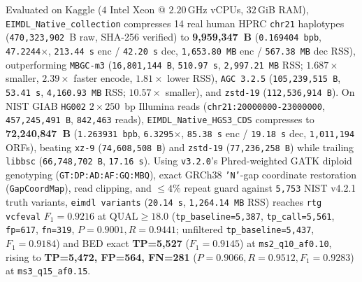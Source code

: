 \documentclass[10pt]{article}
\theoremstyle{definition}
\begin{document}
\begin{enumerate}
  Evaluated on Kaggle ($4$ Intel Xeon @ $2.20$\,GHz vCPUs, $32$\,GiB RAM), \texttt{EIMDL\_Native\_collection} compresses 14 real human HPRC \texttt{chr21} haplotypes (\texttt{470,323,902}~B raw, SHA-256 verified) to \textbf{9,959,347~B} (\texttt{0.169404~bpb}, \texttt{47.2244$\times$}, \texttt{213.44~s} enc / \texttt{42.20~s} dec, \texttt{1,653.80~MB} enc / \texttt{567.38~MB} dec RSS), outperforming \texttt{MBGC-m3} (\texttt{16,801,144~B}, \texttt{510.97~s}, \texttt{2,997.21~MB} RSS; $1.687\times$ smaller, $2.39\times$ faster encode, $1.81\times$ lower RSS), \texttt{AGC~3.2.5} (\texttt{105,239,515~B}, \texttt{53.41~s}, \texttt{4,160.93~MB} RSS; $10.57\times$ smaller), and \texttt{zstd-19} (\texttt{112,536,914~B}). On NIST GIAB \texttt{HG002} $2\times 250$~bp Illumina reads (\texttt{chr21:20000000-23000000}, \texttt{457,245,491~B}, \texttt{842,463} reads), \texttt{EIMDL\_Native\_HGS3\_CDS} compresses to \textbf{72,240,847~B} (\texttt{1.263931~bpb}, \texttt{6.3295$\times$}, \texttt{85.38~s} enc / \texttt{19.18~s} dec, \texttt{1,011,194} ORFs), beating \texttt{xz-9} (\texttt{74,608,508~B}) and \texttt{zstd-19} (\texttt{77,236,258~B}) while trailing \texttt{libbsc} (\texttt{66,748,702~B}, \texttt{17.16~s}). Using \texttt{v3.2.0}'s Phred-weighted GATK diploid genotyping (\texttt{GT:DP:AD:AF:GQ:MBQ}), exact GRCh38 \texttt{'N'}-gap coordinate restoration (\texttt{GapCoordMap}), read clipping, and $\le 4\%$ repeat guard against \texttt{5,753} NIST v4.2.1 truth variants, \texttt{eimdl variants} (\texttt{20.14~s}, \texttt{1,264.14~MB} RSS) reaches \texttt{rtg vcfeval} \textbf{$F_1=0.9216$} at $\text{QUAL}\ge 18.0$ (\texttt{tp\_baseline=5,387}, \texttt{tp\_call=5,561}, \texttt{fp=617}, \texttt{fn=319}, $P=0.9001, R=0.9441$; unfiltered \texttt{tp\_baseline=5,437}, $F_1=0.9184$) and BED exact \textbf{TP=5,527} ($F_1=0.9145$) at \texttt{ms2\_q10\_af0.10}, rising to \textbf{TP=5,472, FP=564, FN=281} (\textbf{$P=0.9066, R=0.9512, F_1=0.9283$}) at \texttt{ms3\_q15\_af0.15}.
\end{enumerate}
\end{document}
